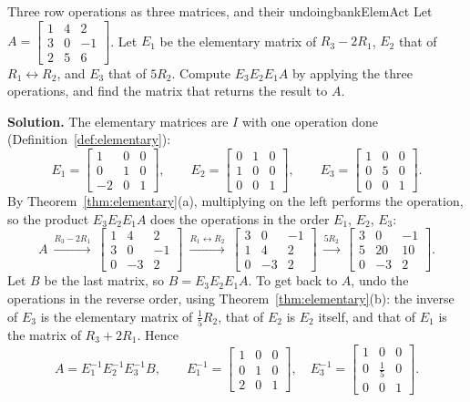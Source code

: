 \documentclass[11pt]{article}
\begin{document}
\begin{exmp}{Three row operations as three matrices, and their undoing}{bankElemAct}
Let $A=\begin{bmatrix}1&4&2\\3&0&-1\\2&5&6\end{bmatrix}$. Let $E_1$ be the elementary matrix of $R_3-2R_1$, $E_2$ that of $R_1\leftrightarrow R_2$, and $E_3$ that of $5R_2$. Compute $E_3E_2E_1A$ by applying the three operations, and find the matrix that returns the result to $A$.

\textbf{Solution.} The elementary matrices are $I$ with one operation done (Definition~\ref{def:elementary}):
\[
E_1=\begin{bmatrix}1&0&0\\0&1&0\\-2&0&1\end{bmatrix},\qquad E_2=\begin{bmatrix}0&1&0\\1&0&0\\0&0&1\end{bmatrix},\qquad E_3=\begin{bmatrix}1&0&0\\0&5&0\\0&0&1\end{bmatrix}.
\]
By Theorem~\ref{thm:elementary}(a), multiplying on the left performs the operation, so the product $E_3E_2E_1A$ does the operations in the order $E_1$, $E_2$, $E_3$:
\[
A\ \xrightarrow{R_3-2R_1}\ \begin{bmatrix}1&4&2\\3&0&-1\\0&-3&2\end{bmatrix}\ \xrightarrow{R_1\leftrightarrow R_2}\ \begin{bmatrix}3&0&-1\\1&4&2\\0&-3&2\end{bmatrix}\ \xrightarrow{5R_2}\ \begin{bmatrix}3&0&-1\\5&20&10\\0&-3&2\end{bmatrix}.
\]
Let $B$ be the last matrix, so $B=E_3E_2E_1A$. To get back to $A$, undo the operations in the reverse order, using Theorem~\ref{thm:elementary}(b): the inverse of $E_3$ is the elementary matrix of $\tfrac15R_2$, that of $E_2$ is $E_2$ itself, and that of $E_1$ is the matrix of $R_3+2R_1$. Hence
\[
A=E_1^{-1}E_2^{-1}E_3^{-1}B,\qquad E_1^{-1}=\begin{bmatrix}1&0&0\\0&1&0\\2&0&1\end{bmatrix},\quad E_3^{-1}=\begin{bmatrix}1&0&0\\0&\tfrac15&0\\0&0&1\end{bmatrix}.
\]
\end{exmp}
\end{document}
